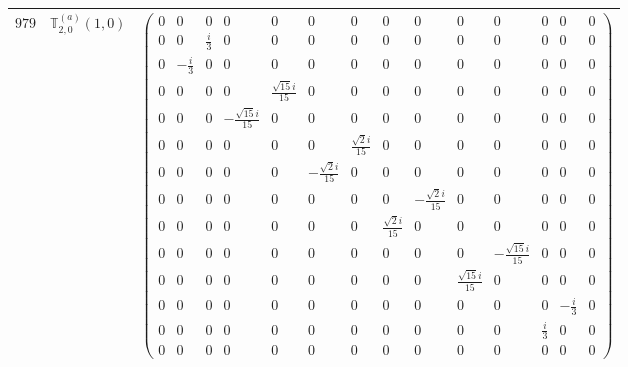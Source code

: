 \documentclass[fleqn,8pt,landscape]{jsarticle}
\begin{document}
\begin{center}
\begin{longtable}{ccc}
$ 979 $ & $ \mathbb{T}_{2,0}^{(a)}(1,0) $ & $ \begin{pmatrix} 0 & 0 & 0 & 0 & 0 & 0 & 0 & 0 & 0 & 0 & 0 & 0 & 0 & 0 \\ 0 & 0 & \frac{i}{3} & 0 & 0 & 0 & 0 & 0 & 0 & 0 & 0 & 0 & 0 & 0 \\ 0 & - \frac{i}{3} & 0 & 0 & 0 & 0 & 0 & 0 & 0 & 0 & 0 & 0 & 0 & 0 \\ 0 & 0 & 0 & 0 & \frac{\sqrt{15} i}{15} & 0 & 0 & 0 & 0 & 0 & 0 & 0 & 0 & 0 \\ 0 & 0 & 0 & - \frac{\sqrt{15} i}{15} & 0 & 0 & 0 & 0 & 0 & 0 & 0 & 0 & 0 & 0 \\ 0 & 0 & 0 & 0 & 0 & 0 & \frac{\sqrt{2} i}{15} & 0 & 0 & 0 & 0 & 0 & 0 & 0 \\ 0 & 0 & 0 & 0 & 0 & - \frac{\sqrt{2} i}{15} & 0 & 0 & 0 & 0 & 0 & 0 & 0 & 0 \\ 0 & 0 & 0 & 0 & 0 & 0 & 0 & 0 & - \frac{\sqrt{2} i}{15} & 0 & 0 & 0 & 0 & 0 \\ 0 & 0 & 0 & 0 & 0 & 0 & 0 & \frac{\sqrt{2} i}{15} & 0 & 0 & 0 & 0 & 0 & 0 \\ 0 & 0 & 0 & 0 & 0 & 0 & 0 & 0 & 0 & 0 & - \frac{\sqrt{15} i}{15} & 0 & 0 & 0 \\ 0 & 0 & 0 & 0 & 0 & 0 & 0 & 0 & 0 & \frac{\sqrt{15} i}{15} & 0 & 0 & 0 & 0 \\ 0 & 0 & 0 & 0 & 0 & 0 & 0 & 0 & 0 & 0 & 0 & 0 & - \frac{i}{3} & 0 \\ 0 & 0 & 0 & 0 & 0 & 0 & 0 & 0 & 0 & 0 & 0 & \frac{i}{3} & 0 & 0 \\ 0 & 0 & 0 & 0 & 0 & 0 & 0 & 0 & 0 & 0 & 0 & 0 & 0 & 0 \end{pmatrix} $ \\ \hline

\end{longtable}
\end{center}
\end{document}
